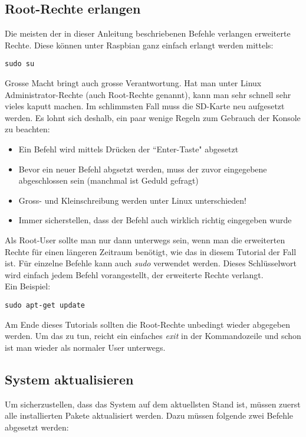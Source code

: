 \subsection{Root-Rechte erlangen}
Die meisten der in dieser Anleitung beschriebenen Befehle verlangen erweiterte Rechte. Diese können unter Raspbian ganz einfach erlangt werden mittels:

\begin{lstlisting}
sudo su
\end{lstlisting}

Grosse Macht bringt auch grosse Verantwortung. Hat man unter Linux Administrator-Rechte (auch Root-Rechte genannt), kann man sehr schnell sehr vieles kaputt machen. Im schlimmsten Fall muss die SD-Karte neu aufgesetzt werden. Es lohnt sich deshalb, ein paar wenige Regeln zum Gebrauch der Konsole zu beachten: 

\begin{itemize}
\item Ein Befehl wird mittels Drücken der ``Enter-Taste" abgesetzt
\item Bevor ein neuer Befehl abgsetzt werden, muss der zuvor eingegebene abgeschlossen sein (manchmal ist Geduld gefragt)
\item Gross- und Kleinschreibung werden unter Linux unterschieden!
\item Immer sicherstellen, dass der Befehl auch wirklich richtig eingegeben wurde
\end{itemize}

Als Root-User sollte man nur dann unterwegs sein, wenn man die erweiterten Rechte für einen längeren Zeitraum benötigt, wie das in diesem Tutorial der Fall ist. Für einzelne Befehle kann auch \textit{sudo} verwendet werden. Dieses Schlüsselwort wird einfach jedem Befehl vorangestellt, der erweiterte Rechte verlangt.
\\
Ein Beispiel:

\begin{lstlisting}
sudo apt-get update
\end{lstlisting}

Am Ende dieses Tutorials sollten die Root-Rechte unbedingt wieder abgegeben werden. Um das zu tun, reicht ein einfaches \textit{exit} in der Kommandozeile und schon ist man wieder als normaler User unterwegs.

\subsection{System aktualisieren}
Um sicherzustellen, dass das System auf dem aktuellsten Stand ist, müssen zuerst alle installierten Pakete aktualisiert werden. Dazu müssen folgende zwei Befehle abgesetzt werden:

